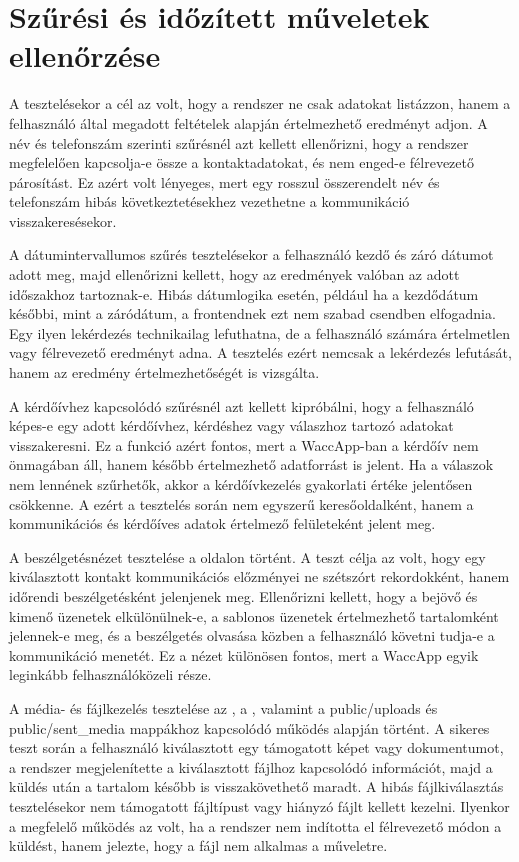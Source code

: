\section{Szűrési és időzített műveletek ellenőrzése}

A  tesztelésekor a cél az volt, hogy a rendszer ne csak adatokat listázzon, hanem a felhasználó által megadott feltételek alapján értelmezhető eredményt adjon. A név és telefonszám szerinti szűrésnél azt kellett ellenőrizni, hogy a rendszer megfelelően kapcsolja-e össze a kontaktadatokat, és nem enged-e félrevezető párosítást. Ez azért volt lényeges, mert egy rosszul összerendelt név és telefonszám hibás következtetésekhez vezethetne a kommunikáció visszakeresésekor.

A dátumintervallumos szűrés tesztelésekor a felhasználó kezdő és záró dátumot adott meg, majd ellenőrizni kellett, hogy az eredmények valóban az adott időszakhoz tartoznak-e. Hibás dátumlogika esetén, például ha a kezdődátum későbbi, mint a záródátum, a frontendnek ezt nem szabad csendben elfogadnia. Egy ilyen lekérdezés technikailag lefuthatna, de a felhasználó számára értelmetlen vagy félrevezető eredményt adna. A tesztelés ezért nemcsak a lekérdezés lefutását, hanem az eredmény értelmezhetőségét is vizsgálta.

A kérdőívhez kapcsolódó szűrésnél azt kellett kipróbálni, hogy a felhasználó képes-e egy adott kérdőívhez, kérdéshez vagy válaszhoz tartozó adatokat visszakeresni. Ez a funkció azért fontos, mert a WaccApp-ban a kérdőív nem önmagában áll, hanem később értelmezhető adatforrást is jelent. Ha a válaszok nem lennének szűrhetők, akkor a kérdőívkezelés gyakorlati értéke jelentősen csökkenne. A  ezért a tesztelés során nem egyszerű keresőoldalként, hanem a kommunikációs és kérdőíves adatok értelmező felületeként jelent meg.

A beszélgetésnézet tesztelése a  oldalon történt. A teszt célja az volt, hogy egy kiválasztott kontakt kommunikációs előzményei ne szétszórt rekordokként, hanem időrendi beszélgetésként jelenjenek meg. Ellenőrizni kellett, hogy a bejövő és kimenő üzenetek elkülönülnek-e, a sablonos üzenetek értelmezhető tartalomként jelennek-e meg, és a beszélgetés olvasása közben a felhasználó követni tudja-e a kommunikáció menetét. Ez a nézet különösen fontos, mert a WaccApp egyik leginkább felhasználóközeli része.

A média- és fájlkezelés tesztelése az , a , valamint a public/uploads és public/sent\_media mappákhoz kapcsolódó működés alapján történt. A sikeres teszt során a felhasználó kiválasztott egy támogatott képet vagy dokumentumot, a rendszer megjelenítette a kiválasztott fájlhoz kapcsolódó információt, majd a küldés után a tartalom később is visszakövethető maradt. A hibás fájlkiválasztás tesztelésekor nem támogatott fájltípust vagy hiányzó fájlt kellett kezelni. Ilyenkor a megfelelő működés az volt, ha a rendszer nem indította el félrevezető módon a küldést, hanem jelezte, hogy a fájl nem alkalmas a műveletre.

